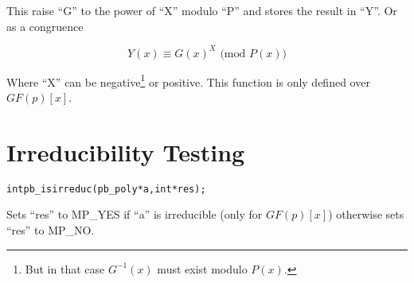 \documentclass[b5paper]{book}
\begin{document}
This raise ``G'' to the power of ``X'' modulo ``P'' and stores the result in ``Y''. Or as a congruence

\begin{equation}
Y(x) \equiv G(x)^X \mbox{ (mod }P(x)\mbox{)}
\end{equation}

Where ``X'' can be negative\footnote{But in that case $G^{-1}(x)$ must exist modulo $P(x)$.} or positive.  This function
is only defined over $GF(p)[x]$.  

\section{Irreducibility Testing}
\begin{alltt}
int pb_isirreduc(pb_poly *a, int *res);
\end{alltt}
Sets ``res'' to MP\_YES if ``a'' is irreducible (only for $GF(p)[x]$) otherwise sets ``res'' to MP\_NO.  


\end{document}
